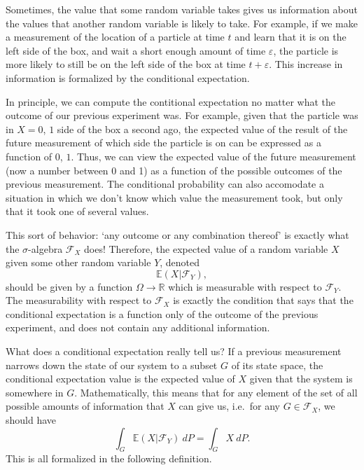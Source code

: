 \documentclass[a4paper]{scrartcl}
\newcommand{\R}{\mathbb{R}}
\theoremstyle{definition}
\theoremstyle{plain}
\theoremstyle{remark}
\begin{document}
Sometimes, the value that some random variable takes gives us information about the values that another random variable is likely to take. For example, if we make a measurement of the location of a particle at time $t$ and learn that it is on the left side of the box, and wait a short enough amount of time $\varepsilon$, the particle is more likely to still be on the left side of the box at time $t + \varepsilon$. This increase in information is formalized by the conditional expectation.

In principle, we can compute the contitional expectation no matter what the outcome of our previous experiment was. For example, given that the particle was in $X = 0$, $1$ side of the box a second ago, the expected value of the result of the future measurement of which side the particle is on can be expressed as a function of $0$, $1$. Thus, we can view the expected value of the future measurement (now a number between 0 and 1) as a function of the possible outcomes of the previous measurement. The conditional probability can also accomodate a situation in which we don't know which value the measurement took, but only that it took one of several values.

This sort of behavior: `any outcome or any combination thereof' is exactly what the $\sigma$-algebra $\mathcal{F}_{X}$ does! Therefore, the expected value of a random variable $X$ given some other random variable $Y$, denoted
\begin{equation*}
  \mathbb{E}(X | \mathcal{F}_{Y}),
\end{equation*}
should be given by a function $\Omega \to \R$ which is measurable with respect to $\mathcal{F}_{Y}$. The measurability with respect to $\mathcal{F}_{X}$ is exactly the condition that says that the conditional expectation is a function only of the outcome of the previous experiment, and does not contain any additional information.

What does a conditional expectation really tell us? If a previous measurement narrows down the state of our system to a subset $G$ of its state space, the conditional expectation value is the expected value of $X$ given that the system is somewhere in $G$. Mathematically, this means that for any element of the set of all possible amounts of information that $X$ can give us, i.e.\ for any $G \in \mathcal{F}_{X}$, we should have
\begin{equation*}
  \int_{G} \mathbb{E}(X | \mathcal{F}_{Y})\ dP = \int_{G} X\ dP.
\end{equation*}
This is all formalized in the following definition.
\end{document}
